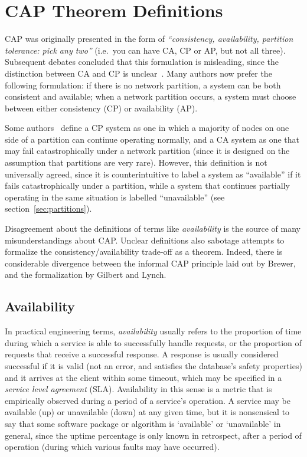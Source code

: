 \documentclass[a4paper,twocolumn,10pt]{article}
\begin{document}
\section{CAP Theorem Definitions}\label{sec:definitions}

CAP was originally presented in the form of \emph{``consistency, availability, partition tolerance:
pick any two''} (i.e.\ you can have CA, CP or AP, but not all three). Subsequent debates concluded
that this formulation is misleading, since the distinction between CA and CP is
unclear~\cite{Brewer2012ba, Hale2010we, Robinson2010tp}. Many authors now prefer the following
formulation: if there is no network partition, a system can be both consistent and available; when a
network partition occurs, a system must choose between either consistency (CP) or availability (AP).

Some authors~\cite{Darcy2010ta, Liochon2015vt} define a CP system as one in which a majority of
nodes on one side of a partition can continue operating normally, and a CA system as one that may
fail catastrophically under a network partition (since it is designed on the assumption that
partitions are very rare). However, this definition is not universally agreed, since it is
counterintuitive to label a system as ``available'' if it fails catastrophically under a partition,
while a system that continues partially operating in the same situation is labelled ``unavailable''
(see section~\ref{sec:partitions}).

Disagreement about the definitions of terms like \emph{availability} is the source of many
misunderstandings about CAP. Unclear definitions also sabotage attempts to formalize the
consistency/availability trade-off as a theorem. Indeed, there is considerable divergence between
the informal CAP principle laid out by Brewer, and the formalization by Gilbert and Lynch.

\subsection{Availability}\label{sec:availability}

In practical engineering terms, \emph{availability} usually refers to the proportion of time during
which a service is able to successfully handle requests, or the proportion of requests that receive
a successful response. A response is usually considered successful if it is valid (not an error, and
satisfies the database's safety properties) and it arrives at the client within some timeout, which
may be specified in a \emph{service level agreement} (SLA). Availability in this sense is a metric
that is empirically observed during a period of a service's operation. A service may be available
(up) or unavailable (down) at any given time, but it is nonsensical to say that some software
package or algorithm is `available' or `unavailable' in general, since the uptime percentage is only
known in retrospect, after a period of operation (during which various faults may have occurred).
\end{document}
